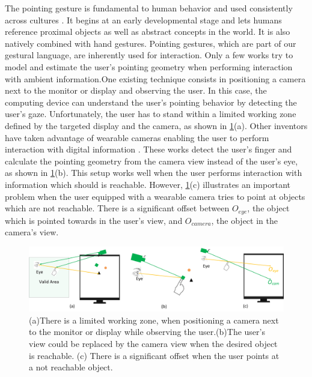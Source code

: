 The pointing gesture is fundamental to human behavior \cite{Matthews2012} and used consistently across cultures \cite{McNeill2000}. It begins at an early developmental stage \cite{Carpendale2010} and lets humans  reference proximal objects as well as abstract concepts in the world. It is also natively combined with hand gestures. Pointing gestures, which are part of our gestural language, are inherently used for interaction\cite{Nanayakkara2013a}. Only a few works try to model and estimate the user{\rq}s pointing geometry when performing interaction with ambient information.One existing technique consists in positioning a camera next to the monitor or display and observing the user. In this case, the computing device can understand the user{\rq}s pointing behavior by detecting the user{\rq}s gaze. Unfortunately, the user has to stand within a limited working zone defined by the targeted display and the camera, as shown in \figurename{ \ref{fig:4-PAST:problem}(a)}.
Other inventors have taken advantage of wearable cameras enabling the user to perform interaction with digital information\cite{Harrison2011} \cite{Mistry2009}.
These works detect the user's finger and calculate the pointing geometry from the camera view instead of the user's eye, as shown in \figurename{ \ref{fig:4-PAST:problem}(b)}. This setup works well when the user performs interaction with information which should is reachable.
However, \figurename{ \ref{fig:4-PAST:problem}(c)} illustrates an important problem when the user equipped with a wearable camera tries to point at objects which are not reachable. There is a significant offset between $O_{eye}$, the object which is pointed towards in the user's view, and $O_{camera}$, the object in the camera's view. 
\begin{figure} [htb]
	\centering
	\includegraphics[width= 1.0\linewidth]{figures/4-PAST/problem.png}
	\caption{(a)There is a limited working zone, when positioning a camera next to the monitor or display while observing the user.(b)The user's view could be replaced by the camera view when the desired object is reachable. (c) There is a significant offset when the user points at a not reachable object.}
	\label{fig:4-PAST:problem}
\end{figure}
